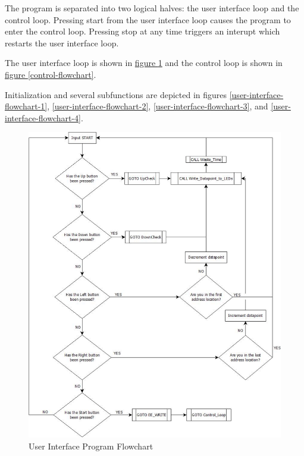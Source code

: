 \documentclass[10pt, twocolumn]{article}
\begin{document}
The program is separated into two logical halves:
the user interface loop and the control loop.
Pressing start from the user interface loop causes the
program to enter the control loop.
Pressing stop at any time triggers an interupt which
restarts the user interface loop.

The user interface loop is shown in
\hyperref[user-interface-flowchart]{figure \ref{user-interface-flowchart}}
and the control loop is shown in
\hyperref[control-flowchart]{figure \ref{control-flowchart}}.

Initialization and several subfunctions are depicted in figures
\ref{user-interface-flowchart-1},
\ref{user-interface-flowchart-2},
\ref{user-interface-flowchart-3}, and
\ref{user-interface-flowchart-4}.

\begin{figure}
	\centering
	\includegraphics[width=1\textwidth]{Figures/user-interface-flowchart.pdf}
	\caption{User Interface Program Flowchart}
	\label{user-interface-flowchart}
\end{figure}
\end{document}
